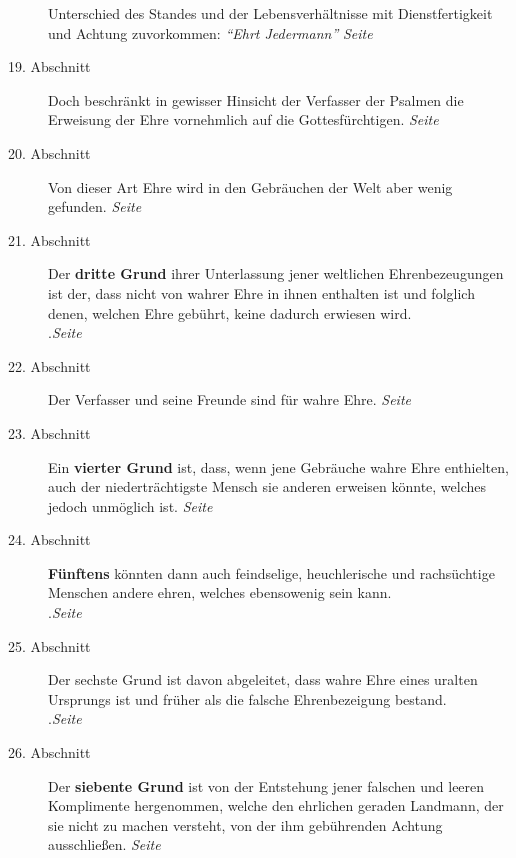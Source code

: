 \begin{description}
Unterschied des Standes und der Lebensverhältnisse mit Dienstfertigkeit und
Achtung zuvorkommen: \textit{"`Ehrt Jedermann"'}
\dotfill \textit{Seite~\pageref{kap9_ab18}}\\
\item[19. Abschnitt] Doch beschränkt in gewisser Hinsicht der Verfasser der
Psalmen die Erweisung der Ehre vornehmlich auf die Gottesfürchtigen.
\dotfill \textit{Seite~\pageref{kap9_ab19}}\\
\item[20. Abschnitt] Von dieser Art Ehre wird in den Gebräuchen der Welt aber
wenig gefunden.
\dotfill \textit{Seite~\pageref{kap9_ab20}}\\
\item[21. Abschnitt] Der \textbf{dritte Grund} ihrer Unterlassung jener
weltlichen
Ehrenbezeugungen ist der, dass nicht von wahrer Ehre in ihnen enthalten ist und
folglich denen, welchen Ehre gebührt, keine dadurch erwiesen wird.\\
.\dotfill \textit{Seite~\pageref{kap9_ab21}}\\
\item[22. Abschnitt] Der Verfasser und seine Freunde sind für wahre Ehre.
\dotfill \textit{Seite~\pageref{kap9_ab22}}\\
\item[23. Abschnitt] Ein \textbf{vierter Grund} ist, dass, wenn jene Gebräuche
wahre Ehre
enthielten, auch der niederträchtigste Mensch sie anderen erweisen könnte,
welches jedoch unmöglich ist.
\dotfill \textit{Seite~\pageref{kap9_ab23}}\\
\item[24. Abschnitt] \textbf{Fünftens} könnten dann auch feindselige,
heuchlerische und
rachsüchtige Menschen andere ehren, welches ebensowenig sein kann.\\
.\dotfill \textit{Seite~\pageref{kap9_ab24}}\\
\item[25. Abschnitt] Der sechste Grund ist davon abgeleitet, dass wahre Ehre
eines uralten Ursprungs ist und früher als die falsche Ehrenbezeigung bestand.\\
.\dotfill \textit{Seite~\pageref{kap9_ab25}}\\
\item[26. Abschnitt] Der \textbf{siebente Grund} ist von der Entstehung jener
falschen
und leeren Komplimente hergenommen, welche den ehrlichen geraden Landmann, der
sie nicht zu machen versteht, von der ihm gebührenden Achtung ausschließen.
\dotfill \textit{Seite~\pageref{kap9_ab26}}\\

\end{description}
